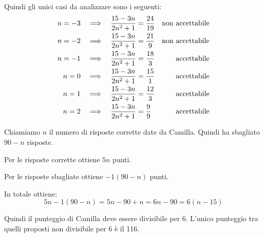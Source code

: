 \begin{soluzione}
    Quindi gli unici casi da analizzare sono i seguenti:
    \begin{align*}
        n = -3 & \quad\Longrightarrow\quad  \dfrac{15 - 3n}{2n^2 + 1} = \dfrac{24}{19} &\text{non accettabile} \\
        n = -2 & \quad\Longrightarrow\quad  \dfrac{15 - 3n}{2n^2 + 1} = \dfrac{21}{9} &\text{non accettabile} \\
        n = -1 & \quad\Longrightarrow\quad  \dfrac{15 - 3n}{2n^2 + 1} = \dfrac{18}{3} &\text{accettabile} \\
        n = 0 & \quad\Longrightarrow\quad  \dfrac{15 - 3n}{2n^2 + 1} = \dfrac{15}{1} &\text{accettabile} \\
        n = 1 & \quad\Longrightarrow\quad  \dfrac{15 - 3n}{2n^2 + 1} = \dfrac{12}{3} &\text{accettabile} \\
        n = 2 & \quad\Longrightarrow\quad  \dfrac{15 - 3n}{2n^2 + 1} = \dfrac{9}{9} &\text{accettabile}
    \end{align*}
\end{soluzione}

\begin{soluzione}
    Chiamiamo $n$ il numero di risposte corrette date da Camilla.
    Quindi ha sbagliato $90 - n$ risposte.

    Per le risposte corrette ottiene $5n$ punti.

    Per le risposte sbagliate ottiene $-1(90-n)$ punti.

    In totale ottiene:
    \[
        5n - 1(90 - n) = 5n - 90 + n = 6n - 90 = 6(n - 15)
    \]

    Quindi il punteggio di Camilla deve essere divisibile per 6.
    L'unico punteggio tra quelli proposti non divisibile per 6 è il 116.



\end{soluzione}


